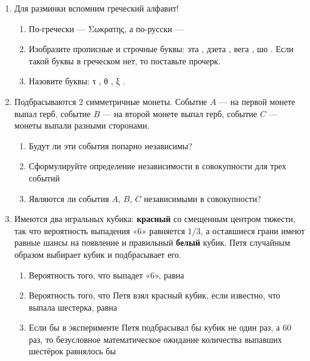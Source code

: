 \begin{enumerate}
\item Для разминки вспомним греческий алфавит!

\begin{enumerate}
\item По-гречески — Σωκρατης, а по-русски — \underline{\hspace{2cm}}
\item Изобразите прописные и строчные буквы: эта \underline{\hspace{2cm}},
дзета \underline{\hspace{2cm}}, вега \underline{\hspace{2cm}},
шо \underline{\hspace{2cm}}. Если такой буквы в греческом нет, то поставьте прочерк.
\item Назовите буквы: τ \underline{\hspace{2cm}}, θ \underline{\hspace{2cm}},
ξ \underline{\hspace{2cm}}.
\end{enumerate}

\item Подбрасываются 2 симметричные монеты. Событие $A$ — на первой монете выпал герб,
событие $B$ — на второй монете выпал герб, событие $C$ — монеты выпали разными сторонами.
\begin{enumerate}
\item Будут ли эти события попарно независимы?
\item Сформулируйте определение независимости в совокупности для трех событий
\item Являются ли события $A$, $B$, $C$ независимыми в совокупности?
\end{enumerate}


\item Имеются два игральных кубика: \textbf{красный} со смещенным центром тяжести,
так что вероятность выпадения «6» равняется $1/3$, а оставшиеся грани имеют равные
шансы на появление и
правильный \textbf{белый} кубик.  Петя случайным образом выбирает кубик и подбрасывает его.
\begin{enumerate}
\item Вероятность того, что выпадет «6», равна \underline{\hspace{2cm}}
\item Вероятность того, что Петя взял красный кубик, если известно, что выпала шестерка,
равна \underline{\hspace{2cm}}
\item Если бы в эксперименте Петя подбрасывал  бы кубик не один раз, а 60 раз,
то безусловное математическое ожидание количества выпавших шестёрок равнялось бы
\underline{\hspace{2cm}}
\end{enumerate}


\end{enumerate}
